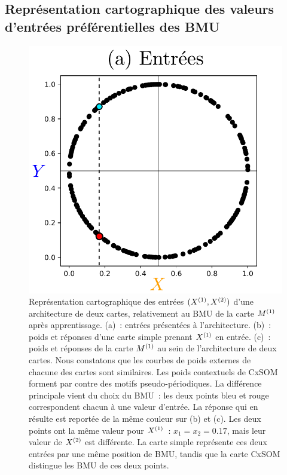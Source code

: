 \documentclass[../main]{subfiles}
\begin{document}
\subsection{Représentation cartographique des valeurs d'entrées préférentielles des BMU}

\begin{figure}
    \includegraphics[width=\textwidth]{2som_inp_noU.pdf}
    \caption{Représentation cartographique des entrées $(X^{({1})},X^{({2})})$ d'une architecture de deux cartes, relativement au BMU de la carte $M^{({1})}$ après apprentissage. 
    (a)~: entrées présentées à l'architecture. (b)~: poids et réponses d'une carte simple prenant $X^{({1})}$ en entrée. (c)~: poids et réponses de la carte $M^{({1})}$ au sein de l'architecture de deux cartes.
    Nous constatons que les courbes de poids externes de chacune des cartes sont similaires. Les poids contextuels de CxSOM forment par contre des motifs pseudo-périodiques. La différence principale vient du choix du BMU~:
    les deux points bleu et rouge correspondent chacun à une valeur d'entrée. La réponse qui en résulte est reportée de la même couleur sur (b) et (c). Les deux points ont la même valeur pour $X^{({1})}$~: $x_1 = x_2 = 0.17$, mais leur valeur de $X^{({2})}$ est différente. 
    La carte simple représente ces deux entrées par une même position de BMU, tandis que la carte CxSOM distingue les BMU de ces deux points. \label{fig:inputs}}
    \end{figure}
\end{document}
